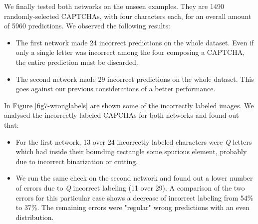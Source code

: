 We finally tested both networks on the unseen examples. They are 1490 randomly-selected CAPTCHAs, with four characters each, for an overall amount of 5960 predictions. We observed the following results:
\begin{itemize}
	\item The first network made 24 incorrect predictions on the whole dataset. Even if only a single letter was incorrect among the four composing a CAPTCHA, the entire prediction must be discarded.
	\item The second network made 29 incorrect predictions on the whole dataset. This goes against our previous considerations of a better performance.
\end{itemize}

In Figure \ref{fig7-wronglabels} are shown some of the incorrectly labeled images. We analysed the incorrectly labeled CAPCHAs for both networks and found out that:
\begin{itemize}
	\item For the first network, 13 over 24 incorrectly labeled characters were \textit{Q} letters which had inside their bounding rectangle some spurious element, probably due to incorrect binarization or cutting.
	\item We run the same check on the second network and found out a lower number of errors due to \textit{Q} incorrect labeling (11 over 29). A comparison of the two errors for this particular case shows a decrease of incorrect labeling from 54\% to 37\%. The remaining errors were "regular" wrong predictions with an even distribution.
\end{itemize}

